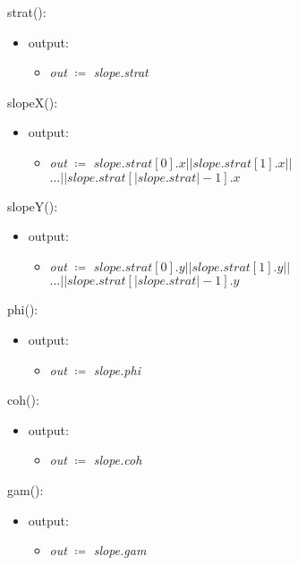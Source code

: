 \documentclass[12pt, titlepage]{article}
\begin{document}
\noindent strat():
\begin{itemize}
	\item output:
	\begin{itemize}
		\item[] \textit{out} $\coloneqq$ \textit{slope.strat}\\
	\end{itemize}
\end{itemize}

\noindent slopeX():
\begin{itemize}
	\item output:
	\begin{itemize}
		\item[] \textit{out} $\coloneqq$ $slope.strat[0].x || 
		slope.strat[1].x ||$\\$ \dots || slope.strat[| 
		slope.strat|-1].x$\\
	\end{itemize}
\end{itemize}

\noindent slopeY():
\begin{itemize}
	\item output:
	\begin{itemize}
		\item[] \textit{out} $\coloneqq$ $slope.strat[0].y || 
		slope.strat[1].y ||$\\$ \dots || slope.strat[| 
		slope.strat|-1].y$\\
	\end{itemize}
\end{itemize}

\noindent phi():
\begin{itemize}
	\item output:
	\begin{itemize}
		\item[] \textit{out} $\coloneqq$ \textit{slope.phi}\\
	\end{itemize}
\end{itemize}

\noindent coh():
\begin{itemize}
	\item output:
	\begin{itemize}
		\item[] \textit{out} $\coloneqq$ \textit{slope.coh}\\
	\end{itemize}
\end{itemize}

\noindent gam():
\begin{itemize}
	\item output:
	\begin{itemize}
		\item[] \textit{out} $\coloneqq$ \textit{slope.gam}\\
	\end{itemize}
\end{itemize}
\end{document}
